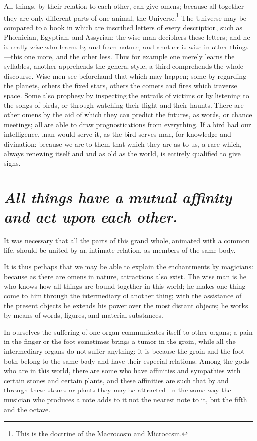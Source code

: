 \documentclass[12pt]{article}
\begin{document}
All things, by their relation to each other, can give omens; because all
together they are only different parts of one animal, the
Universe.\footnote{This is the doctrine of the Macrocosm and Microcosm.} The
Universe may be compared to a book in which are inscribed letters of every
description, such as Ph{\oe}nician, Egyptian, and Assyrian: the wise man
deciphers these letters; and he is really wise who learns by and from nature,
and another is wise in other things---this one more, and the other less. Thus
for example one merely learns the syllables, another apprehends the general
style, a third comprehends the whole discourse. Wise men see beforehand that
which may happen; some by regarding the planets, others the fixed stars, others
the comets and fires which traverse space. Some also prophesy by inspecting the
entrails of victims or by listening to the songs of birds, or through watching
their flight and their haunts. There are other omens by the aid of which they
can predict the futures, as words, or chance meetings; all are able to draw
prognostications from everything. If a bird had our intelligence, man would
serve it, as the bird serves man, for knowledge and divination: because we are
to them that which they are as to us, a race which, always renewing itself and
and as old as the world, is entirely qualified to give signs.


\section{\mdseries\itshape All things have a mutual affinity and act upon each
other.}

It was necessary that all the parts of this grand whole, animated with a common
life, should be united by an intimate relation, as members of the same body.

It is thus perhaps that we may be able to explain the enchantments by
magicians: because as there are omens in nature, attractions also exist. The
wise man is he who knows how all things are bound together in this world; he
makes one thing come to him through the intermediary of another thing; with the
assistance of the present objects he extends his power over the most distant
objects; he works by means of words, figures, and material substances.

In ourselves the suffering of one organ communicates itself to other organs; a
pain in the finger or the foot sometimes brings a tumor in the groin, while all
the intermediary organs do not suffer anything: it is because the groin and the
foot both belong to the same body and have their especial relations. Among the
gods who are in this world, there are some who have affinities and sympathies
with certain stones and certain plants, and these affinities are such that by
and through these stones or plants they may be attracted. In the same way the
musician who produces a note adds to it not the nearest note to it, but the
fifth and the octave.
\end{document}
